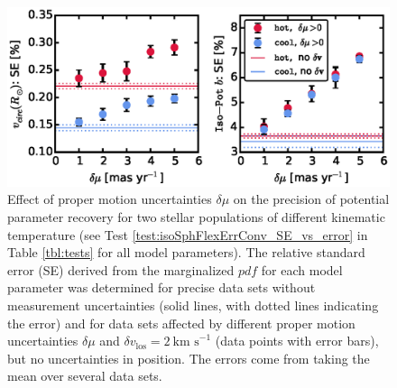 \documentclass[iop,revtex4]{emulateapj}
\newcommand{\pdf}{\ensuremath{pdf}}
\begin{document}
\begin{figure}[!htbp]
\centering
\includegraphics[width=\columnwidth]{figs/isoSphFlexErrConv_SE_vs_error.eps}
\caption{Effect of proper motion uncertainties $\delta \mu$ on the precision of potential parameter recovery for two stellar populations of different kinematic temperature (see Test \ref{test:isoSphFlexErrConv_SE_vs_error} in Table \ref{tbl:tests} for all model parameters). The relative standard error (SE) derived from the marginalized \pdf{} for each model parameter was determined for precise data sets without measurement uncertainties (solid lines, with dotted lines indicating the error) and for data sets affected by different proper motion uncertainties $\delta \mu$ and $\delta v_\text{los}=2~\text{km s}^{-1}$ (data points with error bars), but no uncertainties in position. The errors come from taking the mean over several data sets.}
\label{fig:isoSphFlexErrConv_SE_vs_error}
\end{figure}
\end{document}
